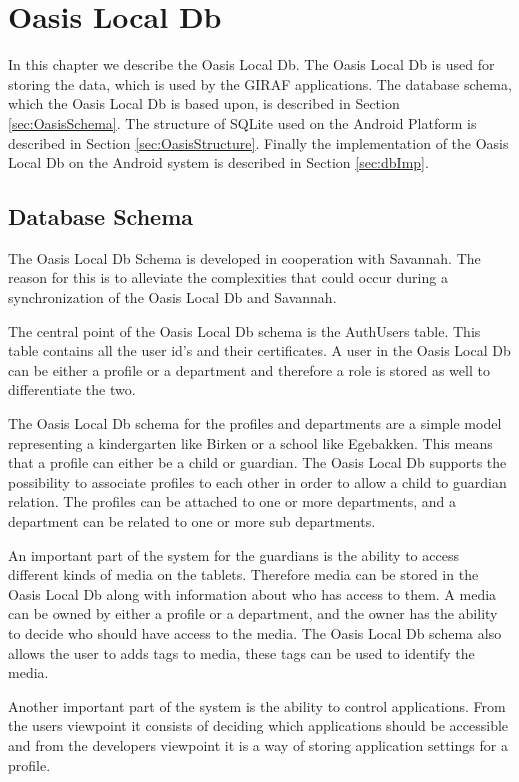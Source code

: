 \chapter{Oasis Local Db}
\label{ch:Db}
In this chapter we describe the Oasis Local Db.
The Oasis Local Db is used for storing the data, which is used by the GIRAF applications.
The database schema, which the Oasis Local Db is based upon, is described in Section \vref{sec:OasisSchema}.
The structure of SQLite used on the Android Platform is described in Section \vref{sec:OasisStructure}.
Finally the implementation of the Oasis Local Db on the Android system is described in Section \vref{sec:dbImp}.

\section{Database Schema}
\label{sec:OasisSchema}
The Oasis Local Db Schema is developed in cooperation with Savannah.
The reason for this is to alleviate the complexities that could occur during a synchronization of the Oasis Local Db and Savannah.

The central point of the Oasis Local Db schema is the AuthUsers table.
This table contains all the user id's and their certificates.
A user in the Oasis Local Db can be either a profile or a department and therefore a role is stored as well to differentiate the two.

The Oasis Local Db schema for the profiles and departments are a simple model representing a kindergarten like Birken or a school like Egebakken.
This means that a profile can either be a child or guardian.
The Oasis Local Db supports the possibility to associate profiles to each other in order to allow a child to guardian relation.
The profiles can be attached to one or more departments, and a department can be related to one or more sub departments.

An important part of the system for the guardians is the ability to access different kinds of media on the tablets.
Therefore media can be stored in the Oasis Local Db along with information about who has access to them.
A media can be owned by either a profile or a department, and the owner has the ability to decide who should have access to the media.
The Oasis Local Db schema also allows the user to adds tags to media, these tags can be used to identify the media.

Another important part of the system is the ability to control applications.
From the users viewpoint it consists of deciding which applications should be accessible and from the developers viewpoint it is a way of storing application settings for a profile.

